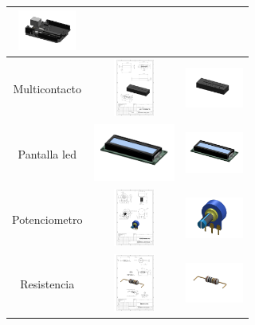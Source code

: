 \begin{table} [H]
\begin{tabular}   {| c |  c |  c | }
       \includegraphics[width=19mm]{1/img/Conector_1.pdf} \\
        \hline
        Multicontacto &  \includegraphics[height=19mm]{1/img/Multicontacto.pdf}  & 
       \includegraphics[width=19mm]{1/img/Multicontacto_1.pdf} \\
        \hline
        Pantalla led & \includegraphics[height=19mm]{1/img/Pantalla Led.pdf}  & 
       \includegraphics[width=19mm]{1/img/Pantalla Led_1.pdf} \\
        \hline
       Potenciometro & \includegraphics[height=19mm]{1/img/Potenciometro.pdf}  & 
       \includegraphics[width=19mm]{1/img/Potenciometro_1.pdf} \\
        \hline
       
        Resistencia & \includegraphics[height=19mm]{1/img/Resistencia.pdf}  & 
       \includegraphics[width=19mm]{1/img/Resistencia_1.pdf} \\
        \hline 
       
        
        \end{tabular} 
       
         \label {tab : my_label}  \label {}
          \end{table} 
    
